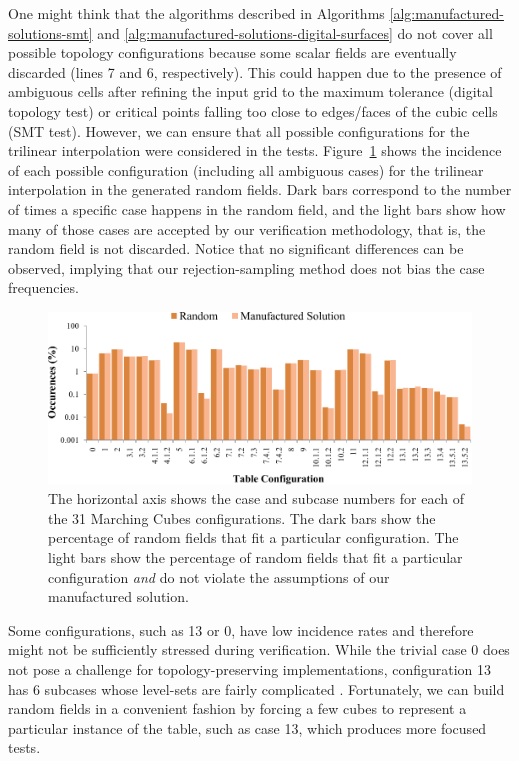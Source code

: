 One might think that the algorithms described in Algorithms
\ref{alg:manufactured-solutions-smt} and
\ref{alg:manufactured-solutions-digital-surfaces} do not cover all
possible topology configurations because 
some scalar fields are eventually discarded (lines 7 and 6,
respectively). This could happen due to the presence of ambiguous cells after
refining the input grid to the maximum tolerance (digital topology test) or 
critical points falling too close to edges/faces of the cubic cells (SMT
test). However, we can ensure that all  
possible configurations for the trilinear interpolation were considered in the tests. 
Figure~\ref{fig:cubes-entries} shows the incidence of each possible
configuration (including all ambiguous cases)  
for the trilinear interpolation in the generated random fields. Dark bars correspond to the
number of times a specific case happens in the random field, and the
light bars show
how many of those cases are accepted by our verification methodology,
that is, the random field is 
not discarded. 
Notice that no significant differences can be observed, implying that
our rejection-sampling method does not bias the case frequencies.

\begin{figure}[t]
\centering
\includegraphics[width=0.9\linewidth,keepaspectratio=true]
{chapter3/figures/random-sampling.pdf}
\caption{The horizontal axis shows the case and subcase numbers for
  each of the 31 Marching Cubes configurations. 
  The dark bars show the percentage of
  random fields that fit a particular configuration. The light bars
  show the percentage of random fields that fit a particular
  configuration \emph{and} do not violate the assumptions of our
  manufactured solution. }
\label{fig:cubes-entries}
\end{figure}

Some configurations, such as 13 or
0, have low incidence rates and therefore might not be sufficiently stressed during verification. While the
trivial case 0 does not pose a challenge for
topology-preserving implementations, configuration 13 has 6 subcases
whose level-sets are fairly complicated \cite{lopes:tvcg:2003,
Nielson03onmarching}. Fortunately, we can build random fields in a convenient
fashion by forcing a few cubes to represent a
particular instance of the table, such as case 13, which produces 
more focused tests.


